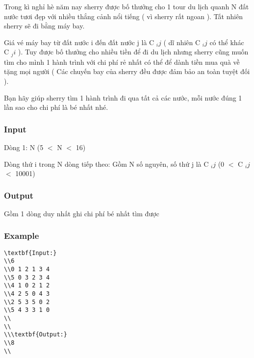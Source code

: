 



   Trong kì nghỉ hè năm nay sherry được bố thưởng cho 1 tour du lịch quanh N đất nước tươi đẹp với nhiều thắng cảnh nổi tiếng ( vì sherry rất ngoan ). Tất nhiên sherry sẽ đi bằng máy bay.  

   Giá vé máy bay từ đất nước i đến đất nước j là C   $_    ij   $   ( dĩ nhiên C   $_    ij   $   có thể khác C   $_    ji   $   ). Tuy được bố thưởng cho nhiều tiền để đi du lịch nhưng sherry cũng muốn tìm cho mình 1 hành trình với chi phí rẻ nhất có thể để dành tiền mua quà về tặng mọi người  ( Các chuyến bay của sherry đều được đảm bảo an toàn tuyệt đối ).  

   Bạn hãy giúp sherry tìm 1 hành trình đi qua tất cả các nước, mỗi nước đúng 1 lần sao cho chi phí là bé nhất nhé.  

\subsubsection{   Input  }

   Dòng 1: N (5 $<$ N $<$ 16)  

   Dòng thứ i trong N dòng tiếp theo: Gồm N số nguyên, số thứ j là C   $_    ij   $   (0 $<$ C   $_    ij   $   $<$ 10001)  

\subsubsection{   Output  }

   Gồm 1 dòng duy nhất ghi chi phí bé nhất tìm được  

\subsubsection{   Example  }
\begin{verbatim}
\textbf{Input:}
\\6
\\0 1 2 1 3 4 
\\5 0 3 2 3 4 
\\4 1 0 2 1 2 
\\4 2 5 0 4 3 
\\2 5 3 5 0 2 
\\5 4 3 3 1 0 
\\
\\
\\\textbf{Output:}
\\8
\\\end{verbatim}